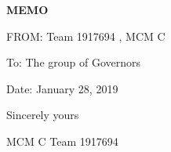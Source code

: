 
\newpage
{}
\thispagestyle{empty}

{\centering \fontsize{18pt}{14pt}\selectfont \textbf{MEMO}\par}

\noindent FROM: Team {} 1917694 , MCM C

\noindent To: The group of Governors

\noindent Date: January 28, 2019

\vspace{10pt}


\thispagestyle{empty}
{\raggedleft
Sincerely yours

MCM C Team 1917694\par
}